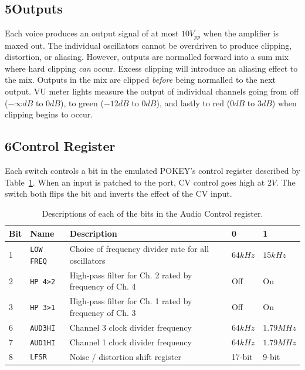 \documentclass[12pt,letter]{article}
\begin{document}
\subsection*{5{\quad}Outputs}

Each voice produces an output signal of at most $10V_{pp}$ when the amplifier is maxed out. The individual oscillators cannot be overdriven to produce clipping, distortion, or aliasing. However, outputs are normalled forward into a sum mix where hard clipping \textit{can} occur. Excess clipping will introduce an aliasing effect to the mix. Outputs in the mix are clipped \textit{before} being normalled to the next output. VU meter lights measure the output of individual channels going from off ($-\infty dB$ to $0dB$), to green ($-12dB$ to $0dB$), and lastly to red ($0dB$ to $3dB$) when clipping begins to occur.

\clearpage
\subsection*{6{\quad}Control Register}

Each switch controls a bit in the emulated POKEY's control register described by Table~\ref{tab:audio-control}. When an input is patched to the port, CV control goes high at $2V$. The switch both flips the bit and inverts the effect of the CV input.

\begin{table}[!htp]
\centering
\caption{Descriptions of each of the bits in the Audio Control register.}
\label{tab:audio-control}
\small
\begin{tabular}{|l|l||l|l|l|}
\hline
 Bit & Name              & Description                                            & 0        & 1          \\
\hline\hline
 1   & \texttt{LOW FREQ} & Choice of frequency divider rate for all oscillators      & $64 kHz$ & $15 kHz$   \\
 2   & \texttt{HP 4>2}   & High-pass filter for Ch. 2 rated by frequency of Ch. 4 & Off      & On         \\
 3   & \texttt{HP 3>1}   & High-pass filter for Ch. 1 rated by frequency of Ch. 3 & Off      & On         \\
 6   & \texttt{AUD3HI}   & Channel 3 clock divider frequency                      & $64 kHz$ & $1.79 MHz$ \\
 7   & \texttt{AUD1HI}   & Channel 1 clock divider frequency                      & $64 kHz$ & $1.79 MHz$ \\
 8   & \texttt{LFSR}     & Noise / distortion shift register                      & 17-bit   & 9-bit      \\
\hline
\end{tabular}
\end{table}
\end{document}
